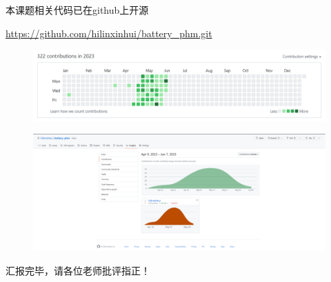 \documentclass{beamer}
\begin{document}
\begin{frame}
	\centering
	本课题相关代码已在github上开源

	\centering
	\url {https://github.com/hilinxinhui/battery_phm.git}

	\begin{figure}[htbp]
		\centering
		\includegraphics[scale=0.3]{figures/github_contribution_log.png}
	\end{figure}

	\begin{figure}[htbp]
		\centering
		\includegraphics[scale=0.15]{figures/github_contribution_log_2.png}
	\end{figure}

\end{frame}

\begin{frame}
	\LARGE \centering 汇报完毕，请各位老师批评指正！
\end{frame}
\end{document}
